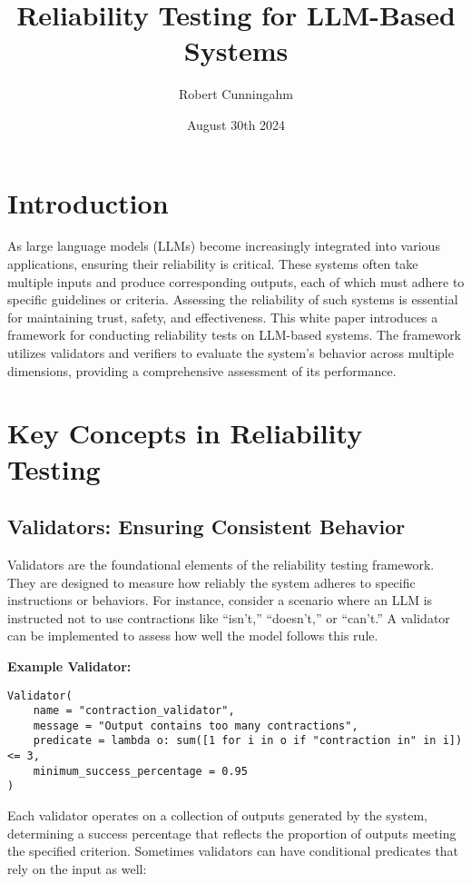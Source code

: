 \documentclass{article}
\title{Reliability Testing for LLM-Based Systems}
\author{Robert Cunningahm}
\date{August 30th 2024}
\begin{document}
\maketitle

\section{Introduction}

As large language models (LLMs) become increasingly integrated into various applications, ensuring their reliability is critical. These systems often take multiple inputs and produce corresponding outputs, each of which must adhere to specific guidelines or criteria. Assessing the reliability of such systems is essential for maintaining trust, safety, and effectiveness. This white paper introduces a framework for conducting reliability tests on LLM-based systems. The framework utilizes validators and verifiers to evaluate the system's behavior across multiple dimensions, providing a comprehensive assessment of its performance.

\vspace{1em}
\section{Key Concepts in Reliability Testing}

\subsection{Validators: Ensuring Consistent Behavior}

Validators are the foundational elements of the reliability testing framework. They are designed to measure how reliably the system adheres to specific instructions or behaviors. For instance, consider a scenario where an LLM is instructed not to use contractions like ``isn't,'' ``doesn't,'' or ``can't.'' A validator can be implemented to assess how well the model follows this rule.

\vspace{1em}
\textbf{Example Validator:}
\begin{lstlisting}
Validator(
    name = "contraction_validator",
    message = "Output contains too many contractions",
    predicate = lambda o: sum([1 for i in o if "contraction in" in i]) <= 3,
    minimum_success_percentage = 0.95
)
\end{lstlisting}

Each validator operates on a collection of outputs generated by the system, determining a success percentage that reflects the proportion of outputs meeting the specified criterion. Sometimes validators can have conditional predicates that rely on the input as well:
\end{document}
